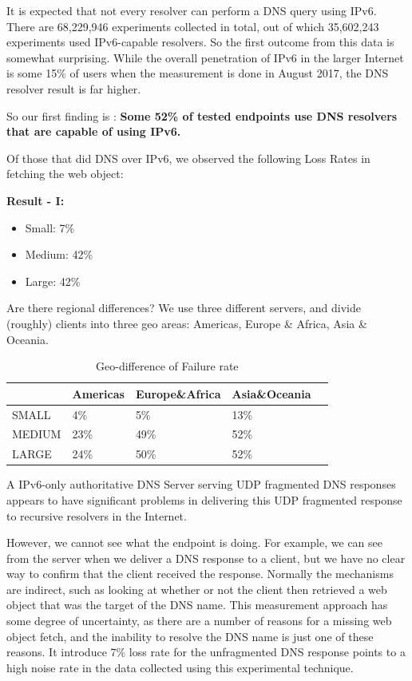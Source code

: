 It is expected that not every resolver can perform a DNS query using
IPv6. There are 68,229,946 experiments collected in total, out of which
35,602,243 experiments used IPv6-capable resolvers. So the first outcome
from this data is somewhat surprising. While the overall penetration of
IPv6 in the larger Internet is some 15\% of users when the measurement is
done in August 2017, the DNS resolver result is far higher.

So our first finding is : \textbf{Some 52\% of tested endpoints use DNS resolvers
that are capable of using IPv6.}

Of those that did DNS over IPv6, we observed the following Loss   Rates in fetching the web object:

\textbf{Result - I:}
\begin{itemize}
  \item Small:    7\%
  \item Medium: 42\%
  \item Large: 42\%
\end{itemize}
Are   there regional differences? We use three different servers,
and   divide (roughly) clients into three geo   areas: Americas,
Europe \& Africa, Asia \& Oceania.

\begin{table}[]
   \caption{Geo-difference of Failure rate}
   \centering
\begin{tabular}{@{}lllll@{}}
\toprule
          & Americas & Europe\&Africa & Asia\&Oceania &  \\ \midrule
SMALL     & 4\%      & 5\%    & 13\% &  \\
MEDIUM    & 23\%      & 49\%   & 52\% &  \\
LARGE     & 24\%      & 50\%   & 52\% &  \\ \bottomrule
\end{tabular}
\label{tab:geo_Fail}
\end{table}

A IPv6-only authoritative DNS Server serving UDP fragmented DNS
responses appears to have significant problems in delivering this
UDP fragmented response to recursive resolvers in the Internet.

However, we cannot see what the endpoint is doing. For example,
we can see from the server when we deliver a DNS response to a client,
but we have no clear way to confirm that the client received the
response. Normally the mechanisms are indirect, such as looking at
whether or not the client then retrieved a web object that was the
target of the DNS name. This measurement approach has some degree of
uncertainty, as there are a number of reasons for a missing web object
fetch, and the inability to resolve the DNS name is just one of these
reasons. It introduce 7\% loss rate for the unfragmented DNS response
points to a high noise rate in the data   collected using   this experimental
technique.


